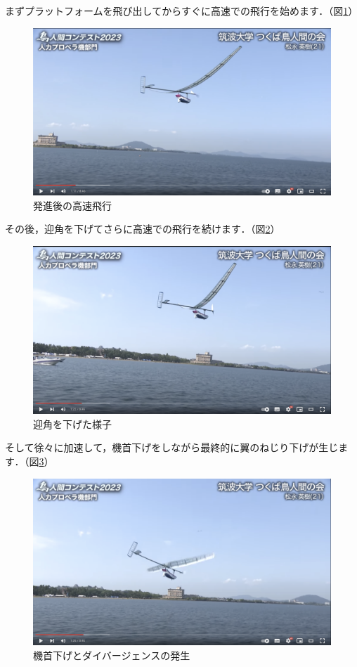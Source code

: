 \documentclass{jarticle}
\begin{document}
まずプラットフォームを飛び出してからすぐに高速での飛行を始めます．（図\ref{tsukuba1}）
\begin{figure}[H]
    \centering
    \includegraphics[width=0.7\linewidth]{image/tsukuba0111.png}
    \caption{発進後の高速飛行}
    \label{tsukuba1}
\end{figure}
その後，迎角を下げてさらに高速での飛行を続けます．（図\ref{tsukuba2}）
\begin{figure}[H]
    \centering
    \includegraphics[width=0.7\linewidth]{image/tsukuba0122.png}
    \caption{迎角を下げた様子}
    \label{tsukuba2}
\end{figure}
そして徐々に加速して，機首下げをしながら最終的に翼のねじり下げが生じます．（図\ref{tsukuba3}）
\begin{figure}[H]
    \centering
    \includegraphics[width=0.7\linewidth]{image/tsukuba0126.png}
    \caption{機首下げとダイバージェンスの発生}
    \label{tsukuba3}
\end{figure}
\end{document}
